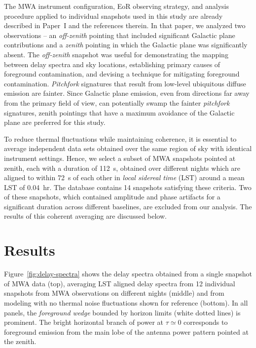 \documentclass[preprint2,apjl,numberedappendix,twocolappendix,appendixfloats]{emulateapj}
\begin{document}
The MWA instrument configuration, EoR observing strategy, and analysis procedure applied to individual snapshots used in this study are already described in Paper~I and the references therein. In that paper, we analyzed two observations -- an {\it off-zenith} pointing that included significant Galactic plane contributions and a {\it zenith} pointing in which the Galactic plane was significantly absent. The {\it off-zenith} snapshot was useful for demonstrating the mapping between delay spectra and sky locations, establishing primary causes of foreground contamination, and devising a technique for mitigating foreground contamination. {\it Pitchfork} signatures that result from low-level ubiquitous diffuse emission are fainter. Since Galactic plane emission, even from directions far away from the primary field of view, can potentially swamp the fainter {\it pitchfork} signatures, zenith pointings that have a maximum avoidance of the Galactic plane are preferred for this study.

To reduce thermal fluctuations while maintaining coherence, it is essential to average independent data sets obtained over the same region of sky with identical instrument settings. Hence, we select a subset of MWA snapshots pointed at zenith, each with a duration of 112~s, obtained over different nights which are aligned to within 72~s of each other in {\it local sidereal time} (LST) around a mean LST of 0.04~hr. The database contains 14 snapshots satisfying these criteria. Two of these snapshots, which contained amplitude and phase artifacts for a significant duration across different baselines, are excluded from our analysis. The results of this coherent averaging are discussed below.

\section{Results}\label{sec:results}

Figure~\ref{fig:delay-spectra} shows the delay spectra obtained from a single snapshot of MWA data (top), averaging LST aligned delay spectra from 12 individual snapshots from MWA observations on different nights (middle) and from modeling with no thermal noise fluctuations shown for reference (bottom). In all panels, the {\it foreground wedge} bounded by horizon limits (white dotted lines) is prominent. The bright horizontal branch of power at $\tau\simeq 0$ corresponds to foreground emission from the main lobe of the antenna power pattern pointed at the zenith. 
\end{document}
